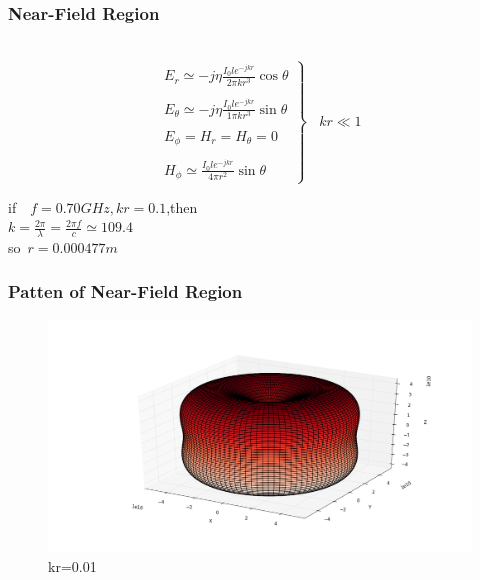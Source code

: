 \documentclass[compress=true]{beamer}
\begin{document}
\begin{frame}
  \frametitle{Near-Field Region}
\begin{block}{~}
  \begin{equation}
    \left.
      \begin{array}{l}
        E_r \simeq -j{\eta}\frac{I_0le^{-jkr}}{2\pi kr^3}\cos{\theta}\\\\
        E_{\theta} \simeq -j{\eta}\frac{I_0le^{-jkr}}{1\pi kr^3}\sin{\theta}\\\\
        E_{\phi}=H_r=H_{\theta}=0\\\\
        H_{\phi}\simeq \frac{I_0le^{-jkr}}{4\pi r^2}\sin{\theta}
      \end{array}
    \right\}~~~~ kr\ll 1
  \end{equation}
\end{block}
\begin{center}
if~~$f=0.70GHz,kr=0.1$,then\\
$k=\frac{2\pi}{\lambda}=\frac{2\pi f}{c}\simeq 109.4$\\
so~$r=0.000477 m$
\end{center}
\end{frame}
\begin{frame}
  \frametitle{Patten of Near-Field Region}
  \begin{figure}
    \includegraphics[height=0.7\textheight]{near_kr_0_01_1.png}
    \caption*{\tiny{kr=0.01}}
  \end{figure}
\end{frame}
\end{document}
